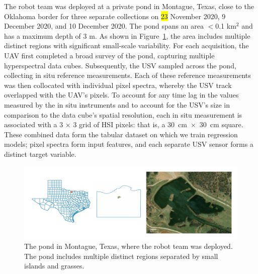 \documentclass[remotesensing,article,accept,pdftex,moreauthors]{Definitions/mdpi}
\begin{document}
The robot team was deployed at a private pond in Montague, Texas, close to the Oklahoma border for three separate collections on \hl{23} %
 November 2020, 9 December 2020, and 10 December 2020. The pond spans an area $<$0.1 km$^{2}$ and has a maximum depth of 3 m. As shown in Figure~\ref{fig:study-area}, the area includes multiple distinct regions with significant small-scale variability. For each acquisition, the UAV first completed a broad survey of the pond, capturing multiple hyperspectral data cubes. Subsequently, the USV sampled across the pond, collecting in situ reference measurements. Each of these reference measurements was then collocated with individual pixel spectra, whereby the USV track overlapped with the UAV's pixels. To account for any time lag in the values measured by the in situ instruments and to account for the USV's size in comparison to the data cube's spatial resolution, each in situ measurement is associated with a 3 $\times$ 3 grid of HSI pixels: that is, a \mbox{30 cm $\times$ 30 cm} square. These combined data form the tabular dataset on which we train regression models; pixel spectra form input features, and each separate USV sensor forms a distinct target variable.

\begin{figure}[H]
\centering
\vspace{-0.1in}
\hspace{-9pt}\includegraphics[width=\columnwidth]{figures/materials-and-methods/study-area.pdf}
\vspace{-0.1in}
\caption{The pond in Montague, Texas, where the robot team was deployed. The pond includes multiple distinct regions separated by small islands and grasses. \label{fig:study-area}}
\end{figure}  
\end{document}
